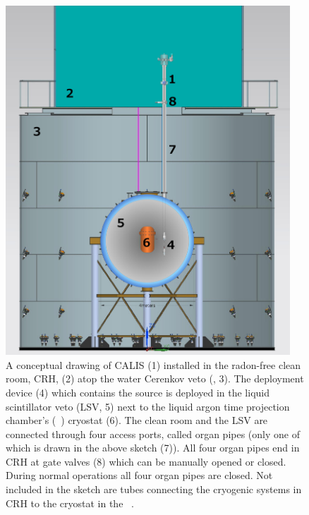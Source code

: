 \begin{figure}[htbp]
 \centering
\includegraphics[width=0.95\textwidth]{Figures/DS50_with_CALIS}
\caption{A conceptual drawing of CALIS (1) installed in the radon-free clean room, CRH, (2) atop the water Cerenkov veto (\wcv, 3). The deployment device (4) which contains the source is deployed in the liquid scintillator veto (LSV, 5) next to the liquid argon time projection chamber's (\lar\ \tpc) cryostat (6). The clean room and the LSV are connected through four access ports, called organ pipes (only one of which is drawn in the above sketch (7)). All four organ pipes end in CRH at gate valves (8) which can be manually opened or closed. During normal operations all four organ pipes are closed. Not included in the sketch are tubes connecting the cryogenic systems in CRH to the cryostat in the \lsv\ \cite{Agnes:2015qyz}.\label{fig:wholeAssembly_insideDetectors}\label{fig:DS50_with_CALIS}}
\end{figure}

